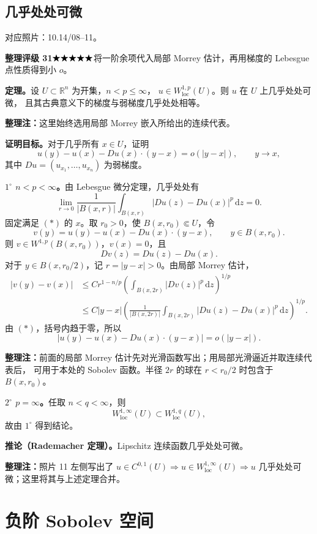 \documentclass[UTF8,a4paper,11pt,fontset=fandol]{ctexart}
\newcommand{\R}{\mathbb R}
\newcommand{\dd}{\,\mathrm d}
\newcommand{\ednote}[1]{\par{\small\color{notegray}\textbf{整理注：}#1}\par}
\newcommand{\source}[1]{{\small\color{notegray}对应照片：#1。}\par}
\newcommand{\proofstars}[1]{\ensuremath{%
\ifnum#1>0\relax\bigstar\fi
\ifnum#1>1\relax\bigstar\fi
\ifnum#1>2\relax\bigstar\fi
\ifnum#1>3\relax\bigstar\fi
\ifnum#1>4\relax\bigstar\fi}}
\newcommand{\proofrating}[3]{\par{\small\color{proofblue}%
\textbf{整理评级 #1}\enspace\proofstars{#2}\quad #3\par}}
\begin{document}
\newpage
\subsection{几乎处处可微}
\source{10.14/08--11}
\proofrating{31}{5}{将一阶余项代入局部 Morrey 估计，再用梯度的 Lebesgue 点性质得到小 $o$。}
\textbf{定理。}设 $U\subset\R^n$ 为开集，$n<p\leq\infty$，
$u\in W^{1,p}_{\mathrm{loc}}(U)$。则 $u$ 在 $U$ 上几乎处处可微，
且其古典意义下的梯度与弱梯度几乎处处相等。
\ednote{这里始终选用局部 Morrey 嵌入所给出的连续代表。}

\textbf{证明目标。}对于几乎所有 $x\in U$，证明
\[
u(y)-u(x)-Du(x)\cdot(y-x)=o(|y-x|),\qquad y\to x,
\]
其中 $Du=(u_{x_1},\ldots,u_{x_n})$ 为弱梯度。

\textbf{$1^\circ$ $n<p<\infty$。}由 Lebesgue 微分定理，几乎处处有
\[
\lim_{r\to0}\frac1{|B(x,r)|}\int_{B(x,r)}|Du(z)-Du(x)|^p\dd z=0.
\tag{$*$}
\]
固定满足 $(*)$ 的 $x$。取 $r_0>0$，使 $B(x,r_0)\Subset U$，令
\[
v(y)=u(y)-u(x)-Du(x)\cdot(y-x),\qquad y\in B(x,r_0).
\]
则 $v\in W^{1,p}(B(x,r_0))$，$v(x)=0$，且
\[
Dv(z)=Du(z)-Du(x).
\]
对于 $y\in B(x,r_0/2)$，记 $r=|y-x|>0$。由局部 Morrey 估计，
\[
\begin{aligned}
|v(y)-v(x)|
&\leq Cr^{1-n/p}\left(\int_{B(x,2r)}|Dv(z)|^p\dd z\right)^{1/p}\\
&\leq C|y-x|\left(\frac1{|B(x,2r)|}
       \int_{B(x,2r)}|Du(z)-Du(x)|^p\dd z\right)^{1/p}.
\end{aligned}
\]
由 $(*)$，括号内趋于零，所以
\[
|u(y)-u(x)-Du(x)\cdot(y-x)|=o(|y-x|).
\]
\ednote{前面的局部 Morrey 估计先对光滑函数写出；用局部光滑逼近并取连续代表后，
可用于本处的 Sobolev 函数。半径 $2r$ 的球在 $r<r_0/2$ 时包含于 $B(x,r_0)$。}

\textbf{$2^\circ$ $p=\infty$。}任取 $n<q<\infty$，则
\[
W^{1,\infty}_{\mathrm{loc}}(U)\subset W^{1,q}_{\mathrm{loc}}(U),
\]
故由 $1^\circ$ 得到结论。

\textbf{推论（Rademacher 定理）。}Lipschitz 连续函数几乎处处可微。
\ednote{照片 11 左侧写出了
$u\in C^{0,1}(U)\Rightarrow u\in W^{1,\infty}_{\mathrm{loc}}(U)
\Rightarrow u$ 几乎处处可微；这里将其与上述定理合并。}

\newpage
\section{负阶 Sobolev 空间}
\end{document}
